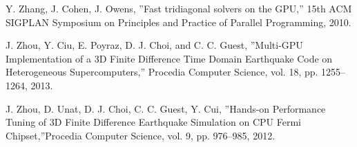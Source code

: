 \documentclass[conference]{IEEEtran}
\begin{document}
\begin{thebibliography}{12}
Y. Zhang, J. Cohen, J. Owens, ''Fast tridiagonal solvers on the GPU,'' 15th ACM SIGPLAN Symposium on Principles and Practice of Parallel Programming, 2010.

J. Zhou, Y. Ciu, E. Poyraz, D. J. Choi, and C. C. Guest, ''Multi-GPU Implementation of a 3D Finite Difference Time Domain Earthquake Code on Heterogeneous Supercomputers,'' Procedia Computer Science, vol. 18, pp. 1255--1264, 2013.

J. Zhou, D. Unat, D. J. Choi, C. C. Guest, Y. Cui, ''Hands-on Performance Tuning of 3D Finite Difference Earthquake Simulation on CPU Fermi Chipset,''Procedia Computer Science, vol. 9, pp. 976--985, 2012.

\end{thebibliography}
\end{document}
